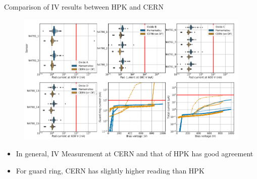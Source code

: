 \documentclass{beamer}
\begin{document}
\begin{frame}{Comparison of IV results between HPK and CERN}
  \begin{figure}
    \includegraphics[width=.7\textwidth]{plots/IV_CERN_HPK_300um_cropped.png}
  \end{figure}
  \begin{itemize}
    \scriptsize
      \item In general, IV Measurement at CERN and that of HPK has \alert{good agreement}
      \item For \alert{guard ring}, CERN has slightly higher reading than HPK 
  \end{itemize}
\end{frame}
\end{document}
